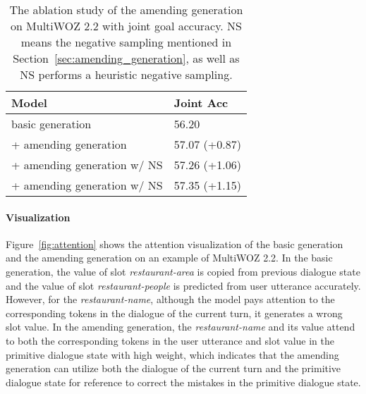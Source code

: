 \documentclass[11pt]{article}
\begin{document}
\begin{table}
\centering
\small
\begin{tabular}{ll}
\hline
\textbf{Model} & \textbf{Joint Acc} \\
\hline
\hline
basic generation & 56.20 \\
\hline
\quad + amending generation & 57.07 (+0.87) \\
\quad + amending generation w/ NS & 57.26 (+1.06) \\
\quad + amending generation w/ NS & 57.35 (+1.15) \\
\hline
\end{tabular}
\caption{The ablation study of the amending generation on MultiWOZ 2.2 with joint goal accuracy. NS means the negative sampling mentioned in Section~\ref{sec:amending_generation}, as well as NS performs a heuristic negative sampling.}\label{tab:ablation-amend}
\end{table}

\paragraph{Visualization} Figure~\ref{fig:attention} shows the attention visualization of the basic generation and the amending generation on an example of MultiWOZ 2.2. In the basic generation, the value of slot \textit{restaurant-area} is copied from previous dialogue state and the value of slot \textit{restaurant-people} is predicted from user utterance accurately. However, for the \textit{restaurant-name}, although the model pays attention to the corresponding tokens in the dialogue of the current turn, it generates a wrong slot value. In the amending generation, the \textit{restaurant-name} and its value attend to both the corresponding tokens in the user utterance and slot value in the primitive dialogue state with high weight, which indicates that the amending generation can utilize both the dialogue of the current turn and the primitive dialogue state for reference to correct the mistakes in the primitive dialogue state.
\end{document}
